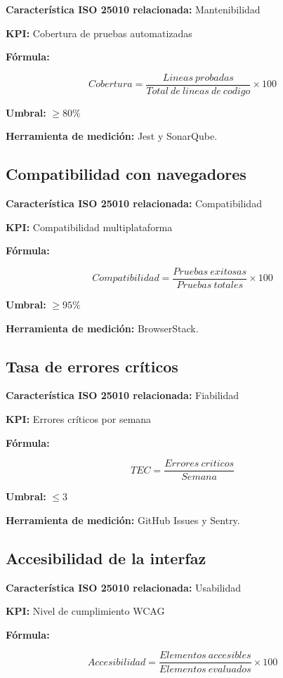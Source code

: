 \documentclass[12pt]{article}
\begin{document}
\textbf{Característica ISO 25010 relacionada:} Mantenibilidad

\textbf{KPI:} Cobertura de pruebas automatizadas

\textbf{Fórmula:}

\[
Cobertura = \frac{Lineas\ probadas}{Total\ de\ lineas\ de\ codigo} \times 100
\]

\textbf{Umbral:} $\geq 80\%$

\textbf{Herramienta de medición:} Jest y SonarQube.

\subsection{Compatibilidad con navegadores}

\textbf{Característica ISO 25010 relacionada:} Compatibilidad

\textbf{KPI:} Compatibilidad multiplataforma

\textbf{Fórmula:}

\[
Compatibilidad = \frac{Pruebas\ exitosas}{Pruebas\ totales} \times 100
\]

\textbf{Umbral:} $\geq 95\%$

\textbf{Herramienta de medición:} BrowserStack.

\subsection{Tasa de errores críticos}

\textbf{Característica ISO 25010 relacionada:} Fiabilidad

\textbf{KPI:} Errores críticos por semana

\textbf{Fórmula:}

\[
TEC = \frac{Errores\ criticos}{Semana}
\]

\textbf{Umbral:} $\leq 3$

\textbf{Herramienta de medición:} GitHub Issues y Sentry.

\subsection{Accesibilidad de la interfaz}

\textbf{Característica ISO 25010 relacionada:} Usabilidad

\textbf{KPI:} Nivel de cumplimiento WCAG

\textbf{Fórmula:}

\[
Accesibilidad = \frac{Elementos\ accesibles}{Elementos\ evaluados} \times 100
\]
\end{document}
